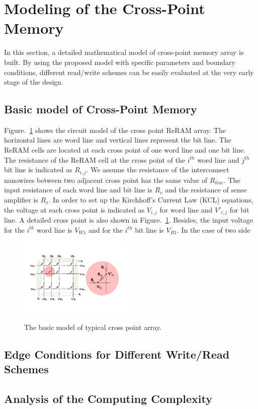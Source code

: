 \vspace{10pt}
\section{Modeling of the Cross-Point Memory}\label{sec:model}

In this section, a detailed mathematical model of cross-point memory array is built. By using the proposed model with specific parameters and
boundary conditions, different read/write schemes can be easily evaluated
at the very early stage of the design.

\subsection{Basic model of Cross-Point Memory}
Figure.~\ref{fig:modeling} shows the circuit model of the cross point ReRAM array. The horizontal lines are word line and vertical lines represent the bit line. The ReRAM cells are located at each cross point of one word line and one bit line. The resistance of the ReRAM cell at the cross point of the $i^{th}$ word line and $j^{th}$ bit line is indicated as $R_{i,j}$. We assume the resistance of the interconnect nanowires between two adjacent cross point has the same value of $R_{line}$. The input resistance of each word line and bit line is $R_v$ and the resistance of sense amplifier is $R_s$. In order to set up the Kirchhoff's Current Law (KCL) equations, the voltage at each cross point is indicated as $V_{i,j}$ for word line and $V'_{i,j}$ for bit line. A detailed cross point is also shown in Figure.~\ref{fig:modeling}. Besides, the input voltage for the $i^{th}$ word line is $V_{W1}$ and for the $i^{th}$ bit line is $V_{B1}$. In the case of two side 

\begin{figure}
\centering
  \includegraphics[width=0.47\textwidth]{./figures/model.pdf}\\
  \caption{The basic model of typical cross point array.}\label{fig:modeling}
\end{figure}
\subsection{Edge Conditions for Different Write/Read Schemes}

\subsection{Analysis of the Computing Complexity}
